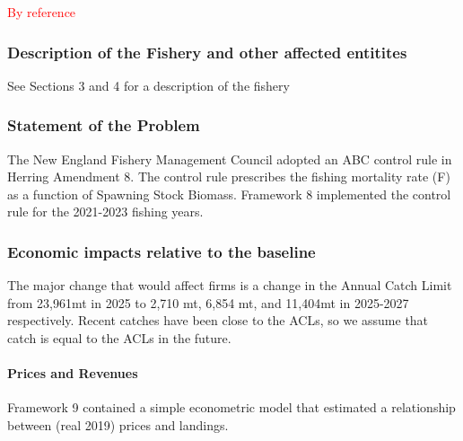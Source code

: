 \documentclass[
  12pt,
]{article}
\begin{document}
\textcolor{red}{By reference}

\hypertarget{description-of-the-fishery-and-other-affected-entitites}{%
\subsubsection{Description of the Fishery and other affected
entitites}\label{description-of-the-fishery-and-other-affected-entitites}}

See Sections 3 and 4 for a description of the fishery

\hypertarget{statement-of-the-problem}{%
\subsubsection{Statement of the
Problem}\label{statement-of-the-problem}}

The New England Fishery Management Council adopted an ABC control rule
in Herring Amendment 8. The control rule prescribes the fishing
mortality rate (F) as a function of Spawning Stock Biomass. Framework 8
implemented the control rule for the 2021-2023 fishing years.

\hypertarget{economic-impacts-relative-to-the-baseline}{%
\subsubsection{Economic impacts relative to the
baseline}\label{economic-impacts-relative-to-the-baseline}}

The major change that would affect firms is a change in the Annual Catch
Limit from 23,961mt in 2025 to 2,710 mt, 6,854 mt, and 11,404mt in
2025-2027 respectively. Recent catches have been close to the ACLs, so
we assume that catch is equal to the ACLs in the future.

\hypertarget{prices-and-revenues}{%
\paragraph{Prices and Revenues}\label{prices-and-revenues}}

Framework 9 contained a simple econometric model that estimated a
relationship between (real 2019) prices and landings.
\end{document}
